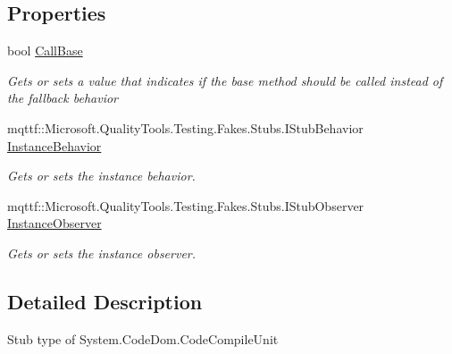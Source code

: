 \subsection*{Properties}
\begin{DoxyCompactItemize}
\item 
bool \hyperlink{class_system_1_1_code_dom_1_1_fakes_1_1_stub_code_compile_unit_a0b6c80195397cd8567da3e07298a199b}{Call\-Base}
\begin{DoxyCompactList}\small\item\em Gets or sets a value that indicates if the base method should be called instead of the fallback behavior\end{DoxyCompactList}\item 
mqttf\-::\-Microsoft.\-Quality\-Tools.\-Testing.\-Fakes.\-Stubs.\-I\-Stub\-Behavior \hyperlink{class_system_1_1_code_dom_1_1_fakes_1_1_stub_code_compile_unit_a5abb5cebb4a01646cf8be4dbe6ad95b6}{Instance\-Behavior}
\begin{DoxyCompactList}\small\item\em Gets or sets the instance behavior.\end{DoxyCompactList}\item 
mqttf\-::\-Microsoft.\-Quality\-Tools.\-Testing.\-Fakes.\-Stubs.\-I\-Stub\-Observer \hyperlink{class_system_1_1_code_dom_1_1_fakes_1_1_stub_code_compile_unit_a13832be6eb24f72f4bb5a28e98a9047a}{Instance\-Observer}
\begin{DoxyCompactList}\small\item\em Gets or sets the instance observer.\end{DoxyCompactList}\end{DoxyCompactItemize}


\subsection{Detailed Description}
Stub type of System.\-Code\-Dom.\-Code\-Compile\-Unit



